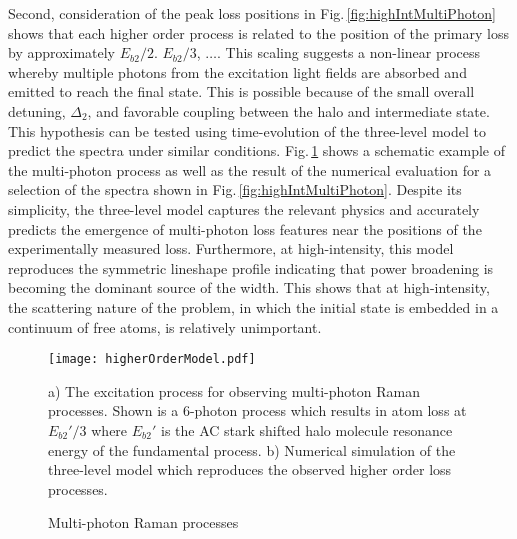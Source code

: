 Second, consideration of the peak loss positions in Fig.\,\ref{fig:highIntMultiPhoton} shows that each higher order process is related to the position of the primary loss by approximately $E_{b2}/2$. $E_{b2}/3$, $\dots$.
This scaling suggests a non-linear process whereby multiple photons from the excitation light fields are absorbed and emitted to reach the final state.
This is possible because of the small overall detuning, $\Delta_2$, and favorable coupling between the halo and intermediate state.
This hypothesis can be tested using time-evolution of the three-level model to predict the spectra under similar conditions.
Fig.\,\ref{fig:multiPhotonTheory} shows a schematic example of the multi-photon process as well as the result of the numerical evaluation for a selection of the spectra shown in Fig.\,\ref{fig:highIntMultiPhoton}.
Despite its simplicity, the three-level model captures the relevant physics and accurately predicts the emergence of multi-photon loss features near the positions of the experimentally measured loss.
Furthermore, at high-intensity, this model reproduces the symmetric lineshape profile indicating that power broadening is becoming the dominant source of the width.
This shows that at high-intensity, the scattering nature of the problem, in which the initial state is embedded in a continuum of free atoms, is relatively unimportant.
	\begin{figure} 
	\centerline{
	  \texttt{[image: higherOrderModel.pdf]}}
	  \caption{Multi-photon Raman processes}{a) The excitation process for observing multi-photon Raman processes. Shown is a 6-photon process which results in atom loss at $E_{b2}'/3$ where $E_{b2}'$ is the AC stark shifted halo molecule resonance energy of the fundamental process. b) Numerical simulation of the three-level model which reproduces the observed higher order loss processes.}
	  \label{fig:multiPhotonTheory}
	\end{figure}




%
%
%
%
%
	
